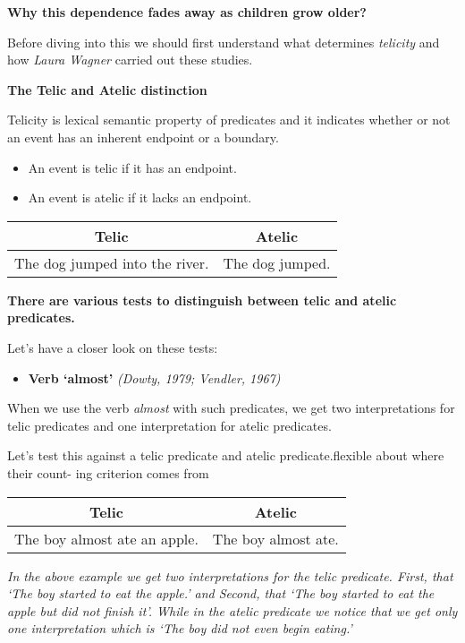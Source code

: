\documentclass[11pt]{article}
\providecommand{\tightlist}{%
      \setlength{\itemsep}{0pt}\setlength{\parskip}{0pt}}
\begin{document}
\textbf{Why this dependence fades away as children grow older?}

Before diving into this we should first understand what determines
\emph{telicity} and how \emph{Laura Wagner} carried out these studies.

    \textbf{The Telic and Atelic distinction}

Telicity is lexical semantic property of predicates and it indicates
whether or not an event has an inherent endpoint or a boundary.

\begin{itemize}
\tightlist
\item
  An event is telic if it has an endpoint.
\item
  An event is atelic if it lacks an endpoint.
\end{itemize}

\begin{longtable}[]{@{}cc@{}}
\toprule
Telic & Atelic\tabularnewline
\midrule
\endhead
The dog jumped into the river. & The dog jumped.\tabularnewline
\bottomrule
\end{longtable}

    \textbf{There are various tests to distinguish between telic and atelic
predicates.}

Let's have a closer look on these tests:

\begin{itemize}
\tightlist
\item
  \textbf{Verb `almost'} \emph{(Dowty, 1979; Vendler, 1967)}
\end{itemize}

When we use the verb \emph{almost} with such predicates, we get two
interpretations for telic predicates and one interpretation for atelic
predicates.

Let's test this against a telic predicate and atelic predicate.flexible
about where their count- ing criterion comes from

\begin{longtable}[]{@{}cc@{}}
\toprule
Telic & Atelic\tabularnewline
\midrule
\endhead
The boy almost ate an apple. & The boy almost ate.\tabularnewline
\bottomrule
\end{longtable}

\emph{In the above example we get two interpretations for the telic
predicate. First, that `The boy started to eat the apple.' and Second,
that `The boy started to eat the apple but did not finish it'. While in
the atelic predicate we notice that we get only one interpretation which
is `The boy did not even begin eating.'}
\end{document}
